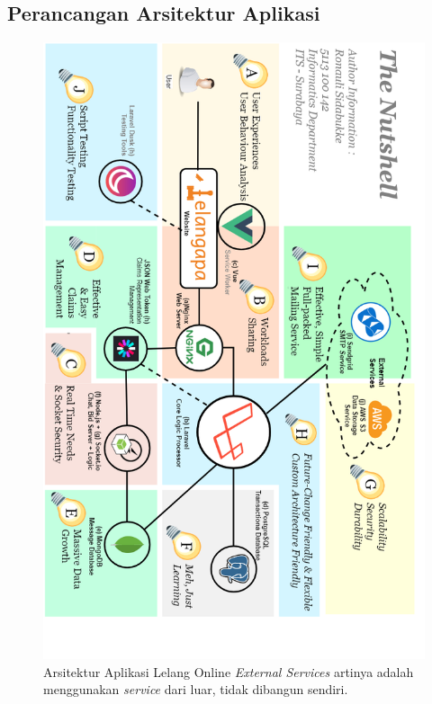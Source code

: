 \subsection{Perancangan Arsitektur Aplikasi}
	
      \begin{figure}[H]
        \centering
        \includegraphics[height=0.6\paperheight]{images/bab3/arsitektur-app-pl_2.png}
        \caption{Arsitektur Aplikasi Lelang Online 
        		\newline
                \textit{External Services} artinya adalah menggunakan \textit{service} dari luar, tidak dibangun sendiri.}
        \label{arsitektur-app}
      \end{figure}
    
